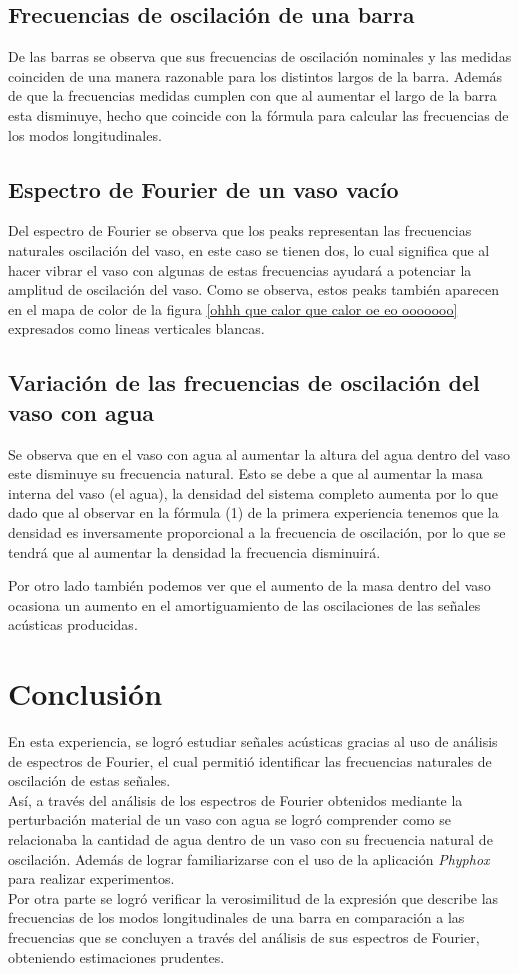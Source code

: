 \documentclass[letterpaper,11pt]{article} %
\begin{document}
\subsection{Frecuencias de oscilación de una barra}
De las barras se observa que sus frecuencias de oscilación nominales y las medidas coinciden de una manera razonable para los distintos largos de la barra. Además de que la frecuencias medidas cumplen con que al aumentar el largo de la barra esta disminuye, hecho que coincide con la fórmula para calcular las frecuencias de los modos longitudinales.
\subsection{Espectro de Fourier de un vaso vacío}
Del espectro de Fourier se observa que los peaks representan las frecuencias naturales oscilación del vaso, en este caso se tienen dos, lo cual significa que al hacer vibrar el vaso con algunas de estas frecuencias ayudará a potenciar la amplitud de oscilación del vaso. Como se observa, estos peaks también aparecen en el mapa de color de la figura \ref{ohhh que calor que calor oe eo ooooooo} expresados como lineas verticales blancas.
\subsection{Variación de las frecuencias de oscilación del vaso con agua }
Se observa que en el vaso con agua al aumentar la altura del agua dentro del vaso este disminuye su frecuencia natural. Esto se debe a que al aumentar la masa interna del vaso (el agua), la densidad del sistema completo aumenta por lo que dado que al observar en la fórmula (1) de la primera experiencia tenemos que la densidad es inversamente proporcional a la frecuencia de oscilación, por lo que se tendrá que al aumentar la densidad la frecuencia disminuirá.


Por otro lado también podemos ver que el aumento de la masa dentro del vaso ocasiona un aumento en el amortiguamiento de las oscilaciones de las señales acústicas producidas.


\newpage \section{Conclusión}
En esta experiencia, se logró estudiar señales acústicas gracias al uso de análisis de espectros de Fourier, el cual permitió identificar las frecuencias naturales de oscilación de estas señales. \\

Así, a través del análisis de los espectros de Fourier obtenidos mediante la perturbación material de un vaso con agua se logró comprender como se relacionaba la cantidad de agua dentro de un vaso con su frecuencia natural de oscilación. Además de lograr familiarizarse con el uso de la aplicación \textit{Phyphox} para realizar experimentos. \\

Por otra parte se logró verificar la verosimilitud de la expresión que describe las frecuencias de los modos longitudinales de una barra en comparación a las frecuencias que se concluyen a través del análisis de sus espectros de Fourier, obteniendo estimaciones prudentes.
\end{document}
